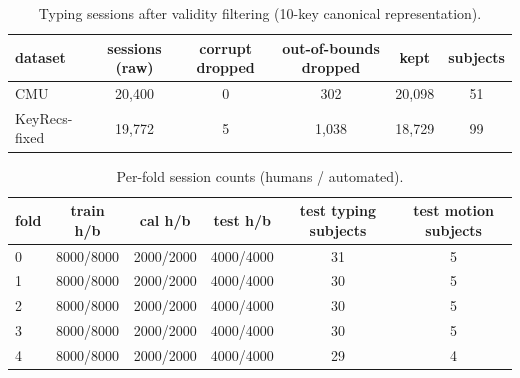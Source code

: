 \begin{table}[t]
\caption{Typing sessions after validity filtering (10-key canonical representation).}
\label{tab:counts}
\centering
\small
\begin{tabular}{lccccc}
\toprule
dataset & sessions (raw) & corrupt dropped & out-of-bounds dropped & kept & subjects \\
\midrule
CMU & 20,400 & 0 & 302 & 20,098 & 51 \\
KeyRecs-fixed & 19,772 & 5 & 1,038 & 18,729 & 99 \\
\bottomrule
\end{tabular}
\end{table}

\begin{table}[t]
\caption{Per-fold session counts (humans / automated).}
\label{tab:folds}
\centering
\small
\begin{tabular}{lccccc}
\toprule
fold & train h/b & cal h/b & test h/b & test typing subjects & test motion subjects \\
\midrule
0 & 8000/8000 & 2000/2000 & 4000/4000 & 31 & 5 \\
1 & 8000/8000 & 2000/2000 & 4000/4000 & 30 & 5 \\
2 & 8000/8000 & 2000/2000 & 4000/4000 & 30 & 5 \\
3 & 8000/8000 & 2000/2000 & 4000/4000 & 30 & 5 \\
4 & 8000/8000 & 2000/2000 & 4000/4000 & 29 & 4 \\
\bottomrule
\end{tabular}
\end{table}
